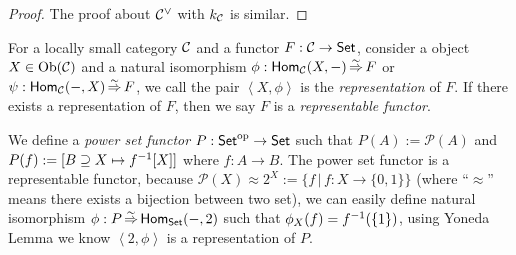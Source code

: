 \documentclass{article}
\begin{document}
\begin{proof}
	The proof about $\mathcal{C}^\vee$ with $k_{\mathcal{C}}$ is similar.
\end{proof}


\begin{defi}
		For a locally small category $\mathcal{C}$ and a functor $F:\mathcal{C}\to\mathsf{Set}$, consider a object $X\in\mathrm{Ob}(\mathcal{C})$ and a natural isomorphism $\phi:\mathsf{Hom}_{\mathcal{C}}(X,-)\mathop{\Rightarrow}\limits^{\sim} F$ or $\psi:\mathsf{Hom}_{\mathcal{C}}(-,X)\mathop{\Rightarrow}\limits^{\sim} F$, we call the pair $\left<X,\phi\right>$ is the \emph{representation} of $F$. If there exists a representation of $F$, then we say $F$ is a \emph{representable functor}.
\end{defi}


\begin{exm}
	We define a \emph{power set functor} $P:\mathsf{Set}^\mathrm{op}\to\mathsf{Set}$ such that $P(A):=\mathscr{P}(A)$ and $P(f):=[B\supseteq X\mapsto f^{-1}[X]]$ where $f:A\to B$. The power set functor is a representable functor, because $\mathscr{P}(X)\approx2^X:=\{f\,|\,f:X\to\{0,1\}\}$ (where ``$\approx$'' means there exists a bijection between two set), we can easily define natural isomorphism $\phi:P\mathop{\Rightarrow}\limits^{\sim}\mathsf{Hom_{Set}}(-,2)$ such that $\phi_X(f)=f^{-1}(\{1\})$, using Yoneda Lemma we know $\left<2,\phi\right>$ is a representation of $P$.
\end{exm}

\newpage

\end{document}
